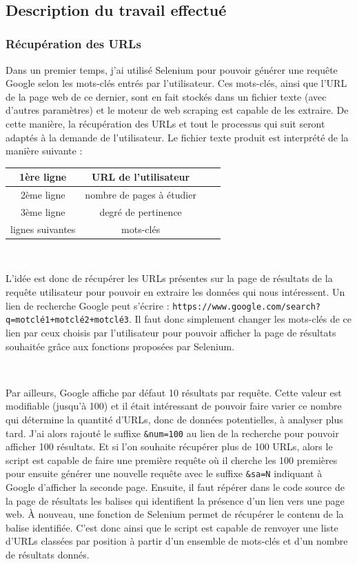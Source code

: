 \documentclass[12pt]{article}
\begin{document}
\


\subsection{Description du travail effectué}

\subsubsection{Récupération des URLs}

Dans un premier temps, j'ai utilisé \textsf{Selenium} pour pouvoir générer une requête Google selon les mots-clés entrés par l'utilisateur. Ces mots-clés, ainsi que l'URL de la page web de ce dernier, sont en fait stockés dans un fichier texte (avec d'autres paramètres) et le moteur de web scraping est capable de les extraire. De cette manière, la récupération des URLs et tout le processus qui suit seront adaptés à la demande de l'utilisateur. Le fichier texte produit est interprété de la manière suivante : 

\begin{center}
 \begin{tabular}{|c|c|c|c|}
\hline
1ère ligne  & URL de l'utilisateur \\
\hline
2ème ligne & nombre de pages à étudier \\
\hline
3ème ligne & degré de pertinence \\
\hline
lignes suivantes & mots-clés \\
\hline
\end{tabular}
\end{center}

\

L'idée est donc de récupérer les URLs présentes sur la page de résultats de la requête utilisateur pour pouvoir en extraire les données qui nous intéressent. Un lien de recherche Google peut s'écrire : \texttt{https://www.google.com/search?q=motclé1+motclé2+motclé3}. Il faut donc simplement changer les mots-clés de ce lien par ceux choisis par l'utilisateur pour pouvoir afficher la page de résultats souhaitée grâce aux fonctions proposées par \textsf{Selenium}. 

\

Par ailleurs, Google affiche par défaut 10 résultats par requête. Cette valeur est modifiable (jusqu'à 100) et il était intéressant de pouvoir faire varier ce nombre qui détermine la quantité d'URLs, donc de données potentielles, à analyser plus tard. J'ai alors rajouté le suffixe \texttt{\&num=100} au lien de la recherche pour pouvoir afficher 100 résultats. Et si l'on souhaite récupérer plus de 100 URLs, alors le script est capable de faire une première requête où il cherche les 100 premières pour ensuite générer une nouvelle requête avec le suffixe \texttt{\&sa=N} indiquant à Google d'afficher la seconde page. Ensuite, il faut répérer dans le code source de la page de résultats les balises qui identifient la présence d'un lien vers une page web. À nouveau, une fonction de\textsf{ Selenium} permet de récupérer le contenu de la balise identifiée. C'est donc ainsi que le script est capable de renvoyer une liste d'URLs classées par position à partir d'un ensemble de mots-clés et d'un nombre de résultats donnés.
\end{document}
